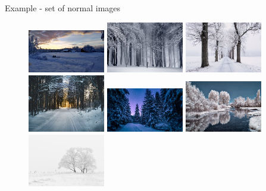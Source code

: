 \documentclass[xcolor=pdftex,dvipsnames,table,mathserif]{beamer}
\begin{document}
\begin{frame}{Example - set of normal images}

  \begin{figure}[ht]
    \centering
    \includegraphics[width=0.3\textwidth]{snow1-pexels-photo-290548.jpg}
    \includegraphics[width=0.3\textwidth]{snow2-pexels-photo-235621.jpg}
    \includegraphics[width=0.3\textwidth]{snow3-pexels-photo-839462.jpeg}
    \includegraphics[width=0.3\textwidth]{snow4-pexels-photo-688660.jpeg}
    \includegraphics[width=0.3\textwidth]{snow5-pexels-photo-773594.jpeg}
    \includegraphics[width=0.3\textwidth]{snow6-pexels-photo-1559117.jpeg}
    \includegraphics[width=0.3\textwidth]{snow7-pexels-photo-66284.jpeg}

\end{figure}
\end{frame}
\end{document}
